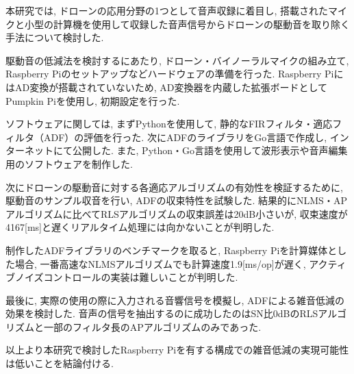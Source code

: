 \begin{jabstract}
本研究では, ドローンの応用分野の1つとして音声収録に着目し, 搭載されたマイクと小型の計算機を使用して収録した音声信号からドローンの駆動音を取り除く手法について検討した. 

駆動音の低減法を検討するにあたり, ドローン・バイノーラルマイクの組み立て, Raspberry
Piのセットアップなどハードウェアの準備を行った.  Raspberry
PiにはAD変換が搭載されていないため, AD変換器を内蔵した拡張ボードとしてPumpkin
Piを使用し, 初期設定を行った. 

ソフトウェアに関しては, まずPythonを使用して, 静的なFIRフィルタ・適応フィルタ（ADF）の評価を行った. 次にADFのライブラリをGo言語で作成し, インターネットにて公開した. また, Python・Go言語を使用して波形表示や音声編集用のソフトウェアを制作した. 

次にドローンの駆動音に対する各適応アルゴリズムの有効性を検証するために, 駆動音のサンプル収音を行い, ADFの収束特性を試験した. 結果的にNLMS・APアルゴリズムに比べてRLSアルゴリズムの収束誤差は20dB小さいが, 収束速度が4167[ms]と遅くリアルタイム処理には向かないことが判明した. 

制作したADFライブラリのベンチマークを取ると, Raspberry Piを計算媒体とした場合, 一番高速なNLMSアルゴリズムでも計算速度1.9[ms/op]が遅く, アクティブノイズコントロールの実装は難しいことが判明した. 

最後に, 実際の使用の際に入力される音響信号を模擬し, ADFによる雑音低減の効果を検討した. 音声の信号を抽出するのに成功したのはSN比0dBのRLSアルゴリズムと一部のフィルタ長のAPアルゴリズムのみであった. 

以上より本研究で検討したRaspberry Piを有する構成での雑音低減の実現可能性は低いことを結論付ける. 
\end{jabstract}

